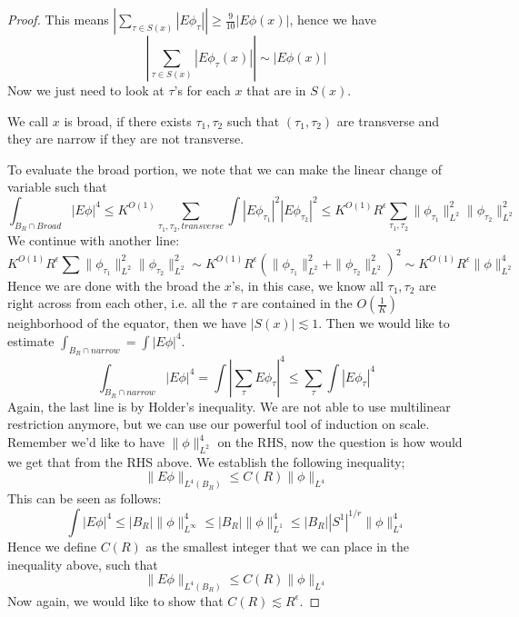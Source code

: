 \begin{proof}
    This means $\left|\sum_{\tau\in S(x)}|E\phi_\tau| \right|\geq\frac{9}{10}|E\phi(x)|$, hence we have
    \begin{equation*}
        \left|\sum_{\tau\in S(x)}|E\phi_\tau(x)| \right|\sim|E\phi(x)|
    \end{equation*}
Now we just need to look at $\tau$'s for each $x$ that are in $S(x)$. 
\begin{definition}
    We call $x$ is broad, if there exists $\tau_1, \tau_2$ such that $(\tau_1, \tau_2)$ are transverse and they are narrow if they are not transverse.    
\end{definition}
    To evaluate the broad portion, we note that we can make the linear change of variable such that 
    \begin{equation*}
        \int_{{B_R}\cap Broad}|E\phi|^4\leq K^{O(1)}\sum_{\tau_1, \tau_2, transverse}\int|E\phi_{\tau_1}|^2|E\phi_{\tau_2}|^2\leq K^{O(1)}R^\epsilon\sum_{\tau_1,\tau_2}\|\phi_{\tau_1}\|_{L^2}^2\|\phi_{\tau_2}\|_{L^2}^2
    \end{equation*}
    We continue with another line:
    \begin{equation*}
        K^{O(1)}R^\epsilon\sum\|\phi_{\tau_1}\|_{L^2}^2\|\phi_{\tau_2}\|_{L^2}^2\sim K^{O(1)}R^\epsilon\left(\|\phi_{\tau_1}\|_{L^2}^2+\|\phi_{\tau_2}\|_{L^2}^2 \right)^2\sim K^{O(1)}R^\epsilon\|\phi\|_{L^2}^4
    \end{equation*}
    Hence we are done with the broad the $x$'s, in this case, we know all $\tau_1, \tau_2$ are right across from each other, i.e. all the $\tau$ are contained in the $O(\frac{1}{K})$ neighborhood of the equator, then we have $|S(x)|\lesssim 1$.
    Then we would like to estimate $\int_{B_R\cap narrow}=\int|E\phi|^4$.
    \begin{equation*}
        \int_{B_R\cap narrow}|E\phi|^4=\int|\sum_\tau E\phi_\tau|^4\leq\sum_\tau\int|E\phi_\tau|^4
    \end{equation*}
    Again, the last line is by Holder's inequality. We are not able to use multilinear restriction anymore, but we can use our powerful tool of induction on scale. Remember we'd like to have $\|\phi\|_{L^2}^4$ on the RHS, now the question is how would we get that from the RHS above. We establish the following inequality;
    \begin{equation*}
        \|E\phi\|_{L^4(B_R)}\leq C(R)\|\phi\|_{L^4}
    \end{equation*}
    This can be seen as follows:
    \begin{equation*}
        \int|E\phi|^4\leq|B_R|\|\phi\|_{L^\infty}^4\leq|B_R|\|\phi\|_{L^1}^4\leq |B_R||S^1|^{1/r}\|\phi\|_{L^4}^4
    \end{equation*}
    Hence we define $C(R)$ as the smallest integer that we can place in the inequality above, such that 
    \begin{equation*}
        \|E\phi\|_{L^4(B_R)}\leq C(R)\|\phi\|_{L^4}
    \end{equation*}
    Now again, we would like to show that $C(R)\lesssim R^\epsilon$.







\end{proof}
